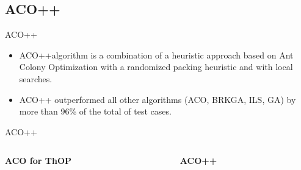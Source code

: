 \documentclass[aspectratio=169]{beamer}
\begin{document}
\subsection{ACO++}
\begin{frame}{ACO++}
\begin{block}{}
\begin{itemize}
    \vspace{0.2cm}
    \item ACO++\footnotemark  algorithm is a combination of a heuristic approach based on Ant Colony Optimization with a randomized packing heuristic and with local searches.
    \vspace{0.2cm}
    \item ACO++ outperformed all other algorithms (ACO, BRKGA, ILS, GA) by more than 96\% of the total of test cases.\footnotemark[4]
    \vspace{0.2cm}
\end{itemize}
\end{block}
\end{frame}

\begin{frame}{ACO++}
\vspace*{-0.2cm}
\begin{columns}
    \begin{column}{0.5\textwidth}
    \begin{center}
        
    \end{center}
    \end{column}
    
    \begin{column}{0.5\textwidth}  
    \begin{center}
         
    \end{center}
    \end{column}
\end{columns}
\begin{columns}
    \begin{column}{0.5\textwidth}
    \begin{center}
        \scriptsize \textbf{ACO for ThOP} \\
    \end{center}
    \end{column}
    
    \begin{column}{0.5\textwidth}  
    \begin{center}
        \scriptsize \textbf{ACO++} \\
    \end{center}
    \end{column}
\end{columns}
\end{frame}
\end{document}
